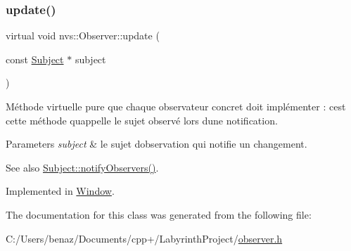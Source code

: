\subsubsection{\texorpdfstring{update()}{update()}}
{\footnotesize\ttfamily virtual void nvs\+::\+Observer\+::update (\begin{DoxyParamCaption}\item[{const \mbox{\hyperlink{classnvs_1_1_subject}{Subject}} $\ast$}]{subject }\end{DoxyParamCaption})\hspace{0.3cm}{\ttfamily [pure virtual]}}



Méthode virtuelle pure que chaque observateur concret doit implémenter \+: c\textquotesingle{}est cette méthode qu\textquotesingle{}appelle le sujet observé lors d\textquotesingle{}une notification. 


\begin{DoxyParams}{Parameters}
{\em subject} & le sujet d\textquotesingle{}observation qui notifie un changement. \\
\hline
\end{DoxyParams}
\begin{DoxySeeAlso}{See also}
\mbox{\hyperlink{classnvs_1_1_subject_ac0c7f6fc31ec3dd61c1e102cb565cdf9}{Subject\+::notify\+Observers()}}. 
\end{DoxySeeAlso}


Implemented in \mbox{\hyperlink{class_window_affdeb2564502d9f4ca63e8c0c0c6f7c0}{Window}}.



The documentation for this class was generated from the following file\+:\begin{DoxyCompactItemize}
\item 
C\+:/\+Users/benaz/\+Documents/cpp+/\+Labyrinth\+Project/\mbox{\hyperlink{observer_8h}{observer.\+h}}\end{DoxyCompactItemize}
